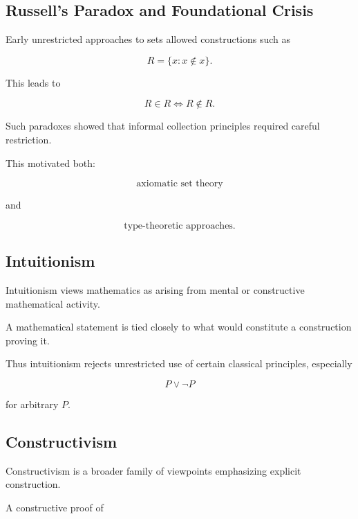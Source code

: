 \subsection{Russell's Paradox and Foundational Crisis}
\label{subsec:russell-foundational-crisis}

Early unrestricted approaches to sets allowed constructions such as

\[
R=\{x:x\notin x\}.
\]

This leads to

\[
\boxed{
R\in R
\iff
R\notin R.
}
\]

Such paradoxes showed that informal collection principles required careful
restriction.

This motivated both:

\[
\boxed{
\text{axiomatic set theory}
}
\]

and

\[
\boxed{
\text{type-theoretic approaches}.
}
\]

\subsection{Intuitionism}
\label{subsec:mathematical-intuitionism}

Intuitionism views mathematics as arising from mental or constructive
mathematical activity.

A mathematical statement is tied closely to what would constitute a
construction proving it.

Thus intuitionism rejects unrestricted use of certain classical principles,
especially

\[
\boxed{
P\lor\neg P
}
\]

for arbitrary \(P\).

\subsection{Constructivism}
\label{subsec:foundational-constructivism}

Constructivism is a broader family of viewpoints emphasizing explicit
construction.

A constructive proof of

